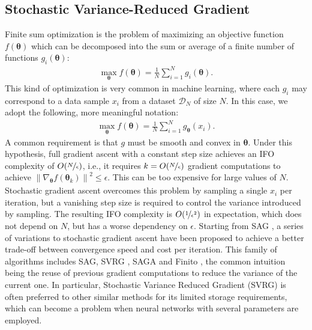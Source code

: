 \documentclass{article}
\makeatletter
\theoremstyle{remark}
\theoremstyle{definition}
\DeclareRobustCommand{\ie}{i.e.,\@\xspace}
\newcommand{\norm}[2][\infty]{\left\|#2\right\|_{#1}}
\newcommand{\vtheta}{\boldsymbol{\theta}}
\makeatother
\begin{document}
\subsection{Stochastic Variance-Reduced Gradient}
Finite sum optimization is the problem of maximizing an objective function $f(\vtheta)$ which can be decomposed into the sum or average of a finite number of functions $g_i(\vtheta)$:
\begin{align*}
\max_{\vtheta} f(\vtheta) = \frac{1}{N}\sum_{i=1}^{N}g_i(\vtheta).
\end{align*}
This kind of optimization is very common in machine learning, where each $g_i$ may correspond to a data sample $x_i$ from a dataset $\mathcal{D}_N$ of size $N$. In this case, we adopt the following, more meaningful notation:
\begin{align*}
\max_{\vtheta} f(\vtheta) = \frac{1}{N}\sum_{i=1}^{N}g_{\vtheta}(x_i).
\end{align*}
A common requirement is that $g$ must be smooth and convex in $\vtheta$. Under this hypothesis, full gradient ascent \cite{cauchy1847methode} with a constant step size achieves an IFO complexity \cite{agarwal2014lower} of $O(\nicefrac{N}{\epsilon})$, \ie it requires $k = O(\nicefrac{N}{\epsilon})$ gradient computations to achieve $\norm[]{\nabla_{\vtheta}f(\vtheta_k)}^2\leq\epsilon$. This can be too expensive for large values of $N$. Stochastic gradient ascent \cite{robbins1951stochastic} \cite{bottou2004large} overcomes this problem by sampling a single $x_i$ per iteration, but a vanishing step size is required to control the variance introduced by sampling. The resulting IFO complexity is $O(\nicefrac{1}{\epsilon^2})$ in expectation, which does not depend on $N$, but has a worse dependency on $\epsilon$. 
Starting from SAG \cite{roux2012stochastic}, a series of variations to stochastic gradient ascent have been proposed to achieve a better trade-off between convergence speed and cost per iteration. This family of algorithms includes SAG, SVRG \cite{johnson2013accelerating}, SAGA \cite{defazio2014saga} and Finito \cite{defazio2014finito}, the common intuition being the reuse of previous gradient computations to reduce the variance of the current one. In particular, Stochastic Variance Reduced Gradient (SVRG) is often preferred to other similar methods for its limited storage requirements, which can become a problem when neural networks with several parameters are employed.  
\end{document}
